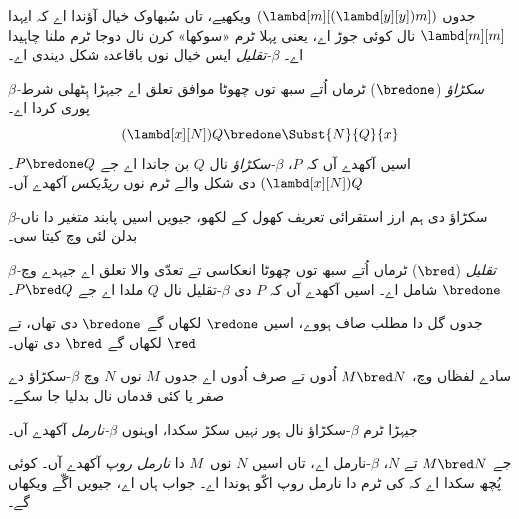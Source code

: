 \documentclass[../../../include/open-logic-section]{subfiles}
\begin{document}

جدوں $(\lambd[m][(\lambd[y][y]) m])$ ویکھیے، تاں سُبھاوک خیال
آؤندا اے کہ ایہدا $\lambd[m][m]$ نال کوئی جوڑ اے، یعنی پہلا
ٹرم «سوکھا» کرن نال دوجا ٹرم ملنا چاہیدا اے۔ \emph{$\beta$-تقلیل}
ایس خیال نوں باقاعدہ شکل دیندی اے۔

\begin{defn} 
  \emph{$\beta$-سکڑاؤ} ($\bredone$) ٹرماں اُتے سبھ توں چھوٹا
  موافق تعلق اے جیہڑا ہِٹھلی شرط پوری کردا اے۔
  \[
    (\lambd[x][N])Q \bredone \Subst{N}{Q}{x}
  \]
  اسیں آکھدے آں کہ $P$، \emph{$\beta$-سکڑاؤ} نال $Q$ بن جاندا
  اے جے $P \bredone Q$۔ $(\lambd[x][N])Q$ دی شکل والے ٹرم
  نوں \emph{ریڈیکس} آکھدے آں۔
\end{defn}

\begin{prob} 
  $\beta$-سکڑاؤ دی ہم ارز استقرائی تعریف کھول کے لکھو، جیویں
  اسیں پابند متغیر دا ناں بدلن لئی 
  وچ کیتا سی۔
\end{prob}

\begin{defn} 
  \emph{$\beta$-تقلیل} ($\bred$) ٹرماں اُتے سبھ توں چھوٹا
  انعکاسی تے تعدّی والا تعلق اے جیہدے وچ $\bredone$ شامل اے۔
  اسیں آکھدے آں کہ $P$ دی $\beta$-تقلیل نال $Q$ ملدا اے جے
  $P \bred Q$۔
\end{defn}

جدوں گل دا مطلب صاف ہووے، اسیں $\redone$ لکھاں گے
$\bredone$ دی تھاں، تے $\red$ لکھاں گے $\bred$ دی تھاں۔

سادے لفظاں وچ، $M \bred N$ اُدوں تے صرف اُدوں اے جدوں $M$
نوں $N$ وچ $\beta$-سکڑاؤ دے صفر یا کئی قدماں نال بدلیا جا سکے۔

\begin{defn}
جیہڑا ٹرم $\beta$-سکڑاؤ نال ہور نہیں سکڑ سکدا، اوہنوں
\emph{$\beta$-نارمل} آکھدے آں۔
\end{defn}

جے $M \bred N$ تے $N$، $\beta$-نارمل اے، تاں اسیں
$N$ نوں~$M$ دا \emph{نارمل روپ} آکھدے آں۔ کوئی پُچھ سکدا اے
کہ کی ٹرم دا نارمل روپ اکّو ہوندا اے۔ جواب ہاں اے، جیویں
اگّے ویکھاں گے۔
\end{document}

